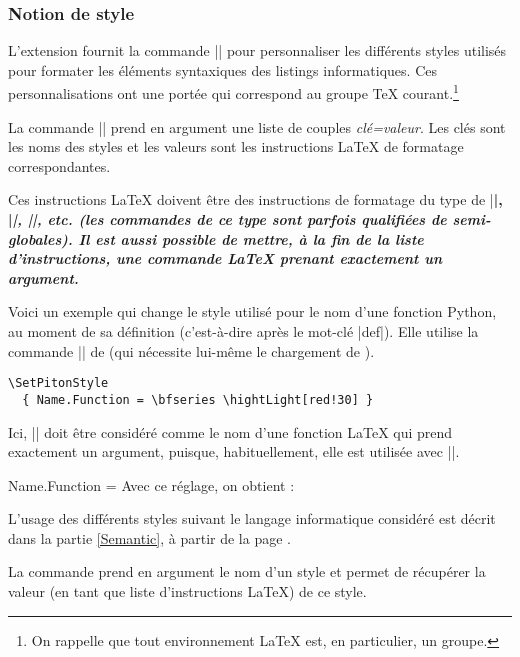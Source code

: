 \documentclass[dvipsnames,svgnames]{article}
\begin{document}
\label{styles}

\subsubsection{Notion de style}

L'extension  fournit la commande |\SetPitonStyle| pour personnaliser les
différents styles utilisés pour formater les éléments syntaxiques des listings
informatiques. Ces personnalisations ont une portée qui correspond au groupe TeX
courant.\footnote{On rappelle que tout environnement LaTeX est, en particulier, un
  groupe.}

\bigskip
{} La commande |\SetPitonStyle| prend en argument une liste de
couples \textsl{clé=valeur}. Les clés sont les noms des styles et les valeurs sont les
instructions LaTeX de formatage correspondantes.

\bigskip
Ces instructions LaTeX doivent être des instructions de formatage du type de |\bfseries|,
|\slshape|, |\color{...}|, etc. (les commandes de ce type sont parfois qualifiées de
\emph{semi-globales}). Il est aussi possible de mettre, \emph{à la fin de la liste
  d'instructions}, une commande LaTeX prenant exactement un argument.

\bigskip
Voici un exemple qui change le style utilisé pour le nom d'une fonction Python, au moment
de sa définition (c'est-à-dire après le mot-clé |def|). Elle utilise la commande
|\highLight| de  (qui nécessite lui-même le chargement de ).

\begin{Verbatim}
\SetPitonStyle
  { Name.Function = \bfseries \hightLight[red!30] }
\end{Verbatim}

Ici, |\highLight[red!30]| doit être considéré comme le nom d'une fonction LaTeX qui prend
exactement un argument, puisque, habituellement, elle est utilisée avec
||.

\medskip
\begingroup
\SetPitonStyle 
  { Name.Function = \bfseries \highLight[red!30] }
Avec ce réglage, on obtient : 
\endgroup


\bigskip
L'usage des différents styles suivant le langage informatique considéré est décrit dans la
partie \ref{Semantic}, à partir de la page \pageref{Semantic}.



\bigskip
{} La commande  prend en argument le
nom d'un style et permet de récupérer la valeur (en tant que liste d'instructions LaTeX)
de ce style.
\end{document}
